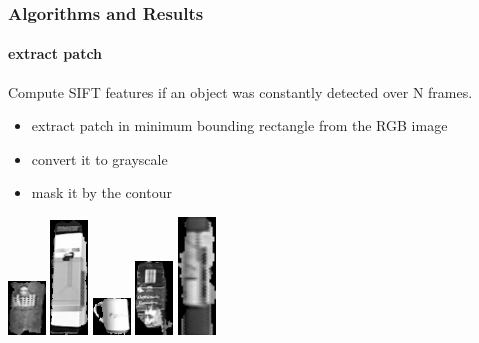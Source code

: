 \documentclass[]{beamer}
\begin{document}
\begin{frame}
    \frametitle{Algorithms and Results}
    \framesubtitle{extract patch}
    
    Compute SIFT features if an object was constantly detected over N frames.
    
    \begin{itemize}
        \item<1-> extract patch in minimum bounding rectangle from the RGB image
        \item<2-> convert it to grayscale
        \item<3-> mask it by the contour
    \end{itemize}
    \includegraphics[width=1cm]{../images/image_sift_12.jpg}
    \hspace{0.1cm}
    \includegraphics[width=1cm]{../images/image_sift_42.jpg}
    \hspace{0.1cm}
    \includegraphics[width=1cm]{../images/image_sift_69.jpg}
    \hspace{0.1cm}
    \includegraphics[width=1cm]{../images/image_sift_87.jpg}
    \hspace{0.1cm}
    \includegraphics[width=1cm]{../images/image_sift_89.jpg}
\end{frame}
\end{document}
